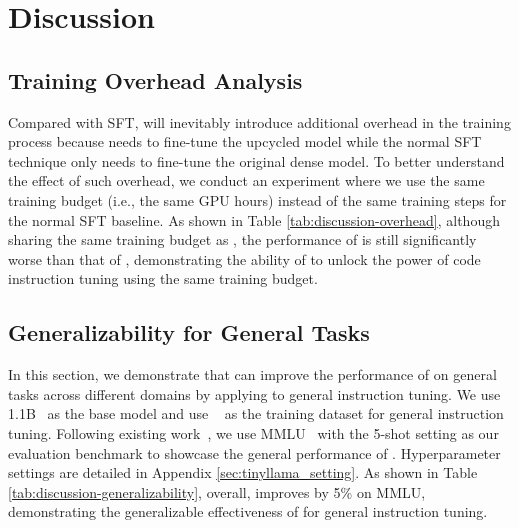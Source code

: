 \section{Discussion}
\subsection{Training Overhead Analysis}

Compared with SFT, \ours will inevitably introduce additional overhead in the training process because \ours needs to fine-tune the upcycled \moe model while the normal SFT technique only needs to fine-tune the original dense model. To better understand the effect of such overhead, we conduct an experiment where we use the same training budget (i.e., the same GPU hours) instead of the same training steps for the normal SFT baseline. As shown in Table \ref{tab:discussion-overhead}, although sharing the same training budget as \oursmerge, the performance of \baselineds is still significantly worse than that of \oursmerge, demonstrating the ability of \ours to unlock the power of code instruction tuning using the same training budget.



\subsection{Generalizability for General Tasks}


In this section, we demonstrate that \ours can improve the performance of  on general tasks across different domains by applying \ours to general instruction tuning. We use \tinyllama 1.1B~\cite{zhang2024tinyllama} as the base model and use \evolgeneral~\cite{xu2023wizardlm} as the training dataset for general instruction tuning. Following existing work~\cite{zhang2024tinyllama}, we use MMLU~\cite{hendrycks2021measuring} with the 5-shot setting as our evaluation benchmark to showcase the general performance of . Hyperparameter settings are detailed in Appendix \ref{sec:tinyllama_setting}. As shown in Table \ref{tab:discussion-generalizability}, overall, \tinyllamamerge improves \baselinetinyllama by 5\% on MMLU, demonstrating the generalizable effectiveness of \ours for general instruction tuning.


